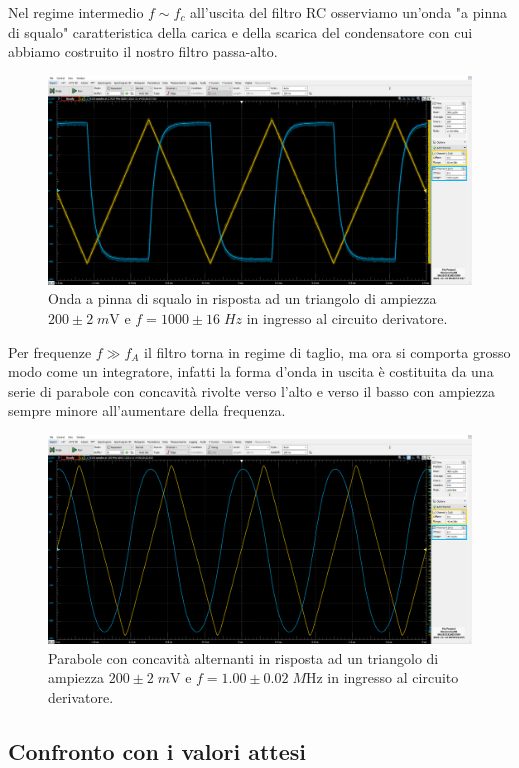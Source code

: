 \documentclass[10pt,a4paper]{article}
\begin{document}
Nel regime intermedio $f \sim f_c$ all'uscita del filtro RC osserviamo un'onda
"a pinna di squalo" caratteristica della carica e della scarica del
condensatore con cui abbiamo costruito il nostro filtro passa-alto.
\begin{figure}[htbp]
\centering
\includegraphics[scale=0.335]{derfin}
\caption{Onda a pinna di squalo in risposta ad un triangolo di ampiezza
$200 \pm 2 \; \si{m\V}$ e $f = 1000 \pm 16 \; \si{Hz}$ in ingresso al
circuito derivatore. \label{fig: derfin}}
\end{figure}

Per frequenze $f \gg f_A$ il filtro torna in regime di taglio, ma ora si
comporta grosso modo come un integratore, infatti la forma d'onda in uscita è
costituita da una serie di parabole con concavità rivolte verso l'alto e verso
il basso con ampiezza sempre minore all'aumentare della frequenza.
\begin{figure}[htbp]
\centering
\includegraphics[scale=0.335]{derpar}
\caption{Parabole con concavità alternanti in risposta ad un triangolo di
ampiezza $200 \pm 2 \; \si{m\V}$ e $f = 1.00 \pm 0.02 \; \si{M\Hz}$ in ingresso
al circuito derivatore. \label{fig: derpar}}
\end{figure}

\subsection{Confronto con i valori attesi}
\end{document}
